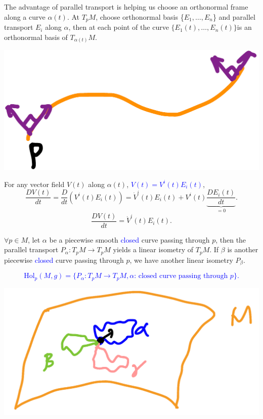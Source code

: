 \begin{remark}
    The advantage of parallel transport is helping us choose an
    orthonormal frame along a curve \(\alpha(t)\). At \(T_p M\),
    choose orthonormal basis \{\(E_1,\ldots,E_n\)\} and parallel
    transport \(E_i\) along \(\alpha\), then at each point 
    of the curve \(\{E_1(t),\ldots,E_n(t)\}\)is an orthonormal basis
    of \(T_{\alpha(t)}M\).
    \begin{center}
        \includegraphics[scale=0.15]{picture/week11/orthonormal basis.png}
    \end{center}
    For any vector field \(V(t)\) along
    \(\alpha(t)\), \textcolor{blue}{\(V(t)=V^i(t)E_i(t)\)},
    \[
        \frac{DV(t)}{dt}=\frac{D}{dt}\left(
            V^i(t)E_i(t)
        \right)    
        =\dot{V}^i(t)E_i(t)+V^i(t)\underbrace{\frac{DE_i(t)}{dt}}_{=0}.
    \]
    \[
        \frac{DV(t)}{dt}=\dot{V}^i(t)E_i(t).
    \]
\end{remark}
\begin{remark}
    \(\forall p\in M\), let \(\alpha\) be a piecewise 
    smooth \textcolor{blue}{closed} curve  passing through \(p\),
    then the parallel transport \(P_\alpha\colon T_p M\to T_p M\)
    yields a linear isometry of \(T_p M\). If \(\beta\) is another
    piecewise \textcolor{blue}{closed} curve passing through \(p\),
    we have another linear isometry \(P_\beta\).
\end{remark}
\textcolor{blue}{
    \begin{definition}
        \[\mathrm{Hol}_p(M,g)=\{P_\alpha\colon T_p M\to T_p M,
        \alpha\text{: closed curve passing
        through }p\}.\]
        \begin{center}
            \includegraphics[scale=0.3]{picture/week11/holonomy groups.png}
        \end{center}
    \end{definition}
}
